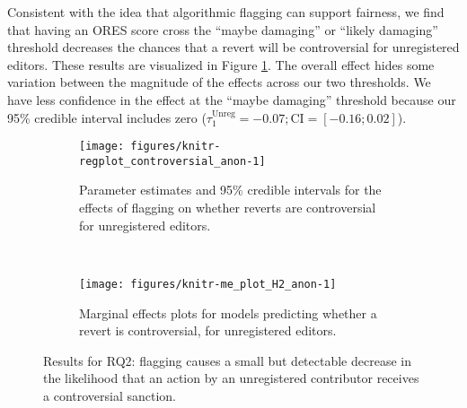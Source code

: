 \documentclass[format=acmsmall, natbib=true,  screen=true]{acmart}
\newenvironment{knitrout}{}{} %
\begin{document}
Consistent with the idea that algorithmic flagging can support fairness, we find that having an ORES score cross the ``maybe damaging'' or ``likely damaging'' threshold decreases the chances that a revert will be controversial for unregistered editors.
These results are visualized in Figure \ref{fig:h2.regplot}. The overall effect hides some variation between the magnitude of the effects across our two thresholds. We have less confidence in the effect at the ``maybe damaging'' threshold because our 95\% credible interval includes zero ($\tau^{\mathrm{Unreg}}_{1}=-0.07;\allowbreak \mathrm{CI}=[-0.16;\allowbreak 0.02]$). 

\begin{figure}
  \centering
\begin{subfigure}[t]{\textwidth}
  \centering
\begin{knitrout}
\color{fgcolor}
\texttt{[image: figures/knitr-regplot\_controversial\_anon-1]} 

\end{knitrout}
\caption{Parameter estimates and 95\% credible intervals for the effects of flagging on  whether reverts are controversial for unregistered editors.  \label{fig:h2.regplot}}
\end{subfigure}
~
\begin{subfigure}[b]{\textwidth}
\centering  

\texttt{[image: figures/knitr-me\_plot\_H2\_anon-1]} 

\caption[RQ2. me plot]{Marginal effects plots for models predicting whether a revert is controversial, for unregistered editors. \label{fig:h2.me}}
\end{subfigure}
\caption[RQ2. plot]{Results for RQ2: flagging causes a small but detectable decrease in the likelihood that an action by an unregistered contributor receives a controversial sanction.}
\end{figure}
\end{document}
